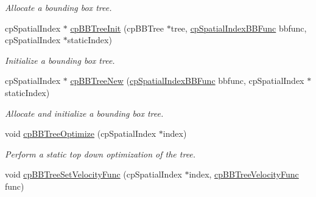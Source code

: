 \begin{DoxyCompactItemize}
\begin{DoxyCompactList}\small\item\em Allocate a bounding box tree. \end{DoxyCompactList}\item 
\hypertarget{group__cp_spatial_index_ga2c7d3e7cda09354f2a15fce6c28e2a81}{}cp\+Spatial\+Index $\ast$ \hyperlink{group__cp_spatial_index_ga2c7d3e7cda09354f2a15fce6c28e2a81}{cp\+B\+B\+Tree\+Init} (cp\+B\+B\+Tree $\ast$tree, \hyperlink{group__cp_spatial_index_gaa8cf991cadcee1fbb6ee9379a0a6e0ea}{cp\+Spatial\+Index\+B\+B\+Func} bbfunc, cp\+Spatial\+Index $\ast$static\+Index)\label{group__cp_spatial_index_ga2c7d3e7cda09354f2a15fce6c28e2a81}

\begin{DoxyCompactList}\small\item\em Initialize a bounding box tree. \end{DoxyCompactList}\item 
\hypertarget{group__cp_spatial_index_gadc8bdef1e33f3c238bf17394b94eacb6}{}cp\+Spatial\+Index $\ast$ \hyperlink{group__cp_spatial_index_gadc8bdef1e33f3c238bf17394b94eacb6}{cp\+B\+B\+Tree\+New} (\hyperlink{group__cp_spatial_index_gaa8cf991cadcee1fbb6ee9379a0a6e0ea}{cp\+Spatial\+Index\+B\+B\+Func} bbfunc, cp\+Spatial\+Index $\ast$static\+Index)\label{group__cp_spatial_index_gadc8bdef1e33f3c238bf17394b94eacb6}

\begin{DoxyCompactList}\small\item\em Allocate and initialize a bounding box tree. \end{DoxyCompactList}\item 
\hypertarget{group__cp_spatial_index_ga299b4e2193ff1df336c925857334364f}{}void \hyperlink{group__cp_spatial_index_ga299b4e2193ff1df336c925857334364f}{cp\+B\+B\+Tree\+Optimize} (cp\+Spatial\+Index $\ast$index)\label{group__cp_spatial_index_ga299b4e2193ff1df336c925857334364f}

\begin{DoxyCompactList}\small\item\em Perform a static top down optimization of the tree. \end{DoxyCompactList}\item 
\hypertarget{group__cp_spatial_index_gaf01118b5105cf3136d4ee6cf372539d5}{}void \hyperlink{group__cp_spatial_index_gaf01118b5105cf3136d4ee6cf372539d5}{cp\+B\+B\+Tree\+Set\+Velocity\+Func} (cp\+Spatial\+Index $\ast$index, \hyperlink{group__cp_spatial_index_ga5e805ddbe3cab9b92a6fbd933ff6e6b0}{cp\+B\+B\+Tree\+Velocity\+Func} func)\label{group__cp_spatial_index_gaf01118b5105cf3136d4ee6cf372539d5}


\end{DoxyCompactItemize}
